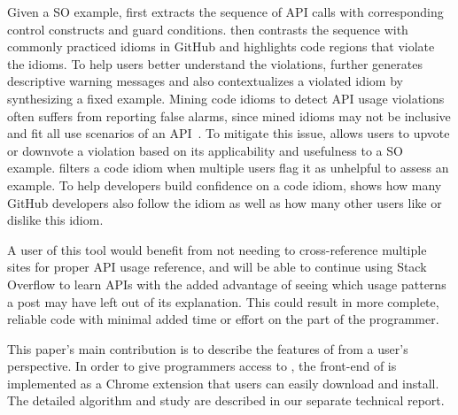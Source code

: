 Given a SO example, {\soa} first extracts the sequence of API calls with corresponding control constructs and guard conditions. {\soa} then contrasts the sequence with commonly practiced idioms in GitHub and highlights code regions that violate the idioms. To help users better understand the violations, {\soa} further generates descriptive warning messages and also contextualizes a violated idiom by synthesizing a fixed example. Mining code idioms to detect API usage violations often suffers from reporting false alarms, since mined idioms may not be inclusive and fit all use scenarios of an API~\cite{liang2016antminer}. To mitigate this issue, {\soa} allows users to upvote or downvote a violation based on its applicability and usefulness to a SO example. {\soa} filters a code idiom when multiple users flag it as unhelpful to assess an example. To help developers build confidence on a code idiom, {\soa} shows how many GitHub developers also follow the idiom as well as how many other users like or dislike this idiom.

A user of this tool would benefit from not needing to cross-reference multiple sites for proper API usage reference, and will be able to continue using Stack Overflow to learn APIs with the added advantage of seeing which usage patterns a post may have left out of its explanation. This could result in more complete, reliable code with minimal added time or effort on the part of the programmer. 

This paper's main contribution is to describe the features of {\soa} from a user's perspective. In order to give programmers access to {\soa}, the front-end of {\soa} is implemented as a Chrome extension that users can easily download and install. The detailed algorithm and study are described in our separate technical report.

%
